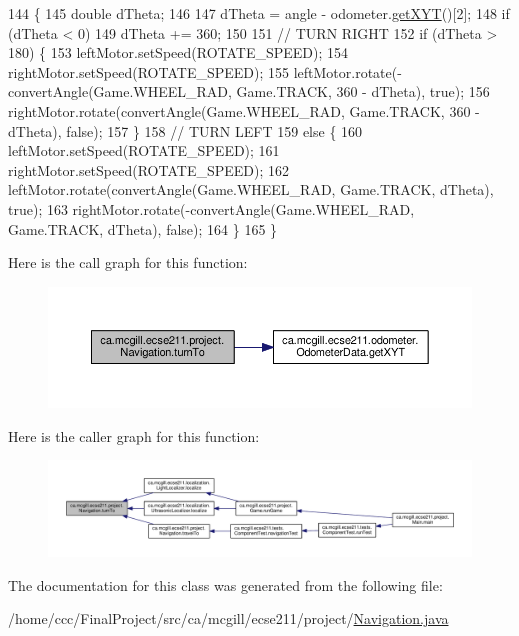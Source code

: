\begin{DoxyCode}
144                                                 \{
145     \textcolor{keywordtype}{double} dTheta;
146 
147     dTheta = angle - odometer.\hyperlink{classca_1_1mcgill_1_1ecse211_1_1odometer_1_1_odometer_data_a8f40f0264c68f0cbed4fff1723ae7863}{getXYT}()[2];
148     \textcolor{keywordflow}{if} (dTheta < 0)
149       dTheta += 360;
150 
151     \textcolor{comment}{// TURN RIGHT}
152     \textcolor{keywordflow}{if} (dTheta > 180) \{
153       leftMotor.setSpeed(ROTATE\_SPEED);
154       rightMotor.setSpeed(ROTATE\_SPEED);
155       leftMotor.rotate(-convertAngle(Game.WHEEL\_RAD, Game.TRACK, 360 - dTheta), \textcolor{keyword}{true});
156       rightMotor.rotate(convertAngle(Game.WHEEL\_RAD, Game.TRACK, 360 - dTheta), \textcolor{keyword}{false});
157     \}
158     \textcolor{comment}{// TURN LEFT}
159     \textcolor{keywordflow}{else} \{
160       leftMotor.setSpeed(ROTATE\_SPEED);
161       rightMotor.setSpeed(ROTATE\_SPEED);
162       leftMotor.rotate(convertAngle(Game.WHEEL\_RAD, Game.TRACK, dTheta), \textcolor{keyword}{true});
163       rightMotor.rotate(-convertAngle(Game.WHEEL\_RAD, Game.TRACK, dTheta), \textcolor{keyword}{false});
164     \}
165   \}
\end{DoxyCode}
Here is the call graph for this function\+:\nopagebreak
\begin{figure}[H]
\begin{center}
\leavevmode
\includegraphics[width=350pt]{classca_1_1mcgill_1_1ecse211_1_1project_1_1_navigation_a3bbe0645f2b3b3d0986b4a707fb5a00c_cgraph}
\end{center}
\end{figure}
Here is the caller graph for this function\+:
\nopagebreak
\begin{figure}[H]
\begin{center}
\leavevmode
\includegraphics[width=350pt]{classca_1_1mcgill_1_1ecse211_1_1project_1_1_navigation_a3bbe0645f2b3b3d0986b4a707fb5a00c_icgraph}
\end{center}
\end{figure}


The documentation for this class was generated from the following file\+:\begin{DoxyCompactItemize}
\item 
/home/ccc/\+Final\+Project/src/ca/mcgill/ecse211/project/\hyperlink{_navigation_8java}{Navigation.\+java}\end{DoxyCompactItemize}
